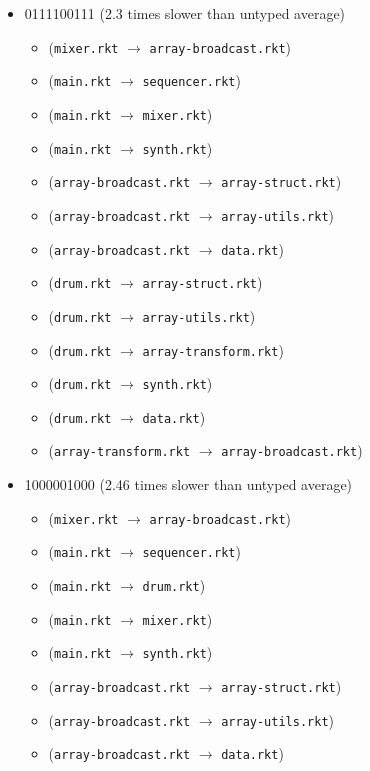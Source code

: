 \documentclass{article}
\newcommand{\mono}[1]{\texttt{#1}}
\begin{document}
\begin{itemize}
\begin{itemize}
  \end{itemize}
\item 0111100111 (2.3 times slower than untyped average)
  \begin{itemize}
  \item (\mono{mixer.rkt} $\rightarrow$ \mono{array-broadcast.rkt})
  \item (\mono{main.rkt} $\rightarrow$ \mono{sequencer.rkt})
  \item (\mono{main.rkt} $\rightarrow$ \mono{mixer.rkt})
  \item (\mono{main.rkt} $\rightarrow$ \mono{synth.rkt})
  \item (\mono{array-broadcast.rkt} $\rightarrow$ \mono{array-struct.rkt})
  \item (\mono{array-broadcast.rkt} $\rightarrow$ \mono{array-utils.rkt})
  \item (\mono{array-broadcast.rkt} $\rightarrow$ \mono{data.rkt})
  \item (\mono{drum.rkt} $\rightarrow$ \mono{array-struct.rkt})
  \item (\mono{drum.rkt} $\rightarrow$ \mono{array-utils.rkt})
  \item (\mono{drum.rkt} $\rightarrow$ \mono{array-transform.rkt})
  \item (\mono{drum.rkt} $\rightarrow$ \mono{synth.rkt})
  \item (\mono{drum.rkt} $\rightarrow$ \mono{data.rkt})
  \item (\mono{array-transform.rkt} $\rightarrow$ \mono{array-broadcast.rkt})
  \end{itemize}
\item 1000001000 (2.46 times slower than untyped average)
  \begin{itemize}
  \item (\mono{mixer.rkt} $\rightarrow$ \mono{array-broadcast.rkt})
  \item (\mono{main.rkt} $\rightarrow$ \mono{sequencer.rkt})
  \item (\mono{main.rkt} $\rightarrow$ \mono{drum.rkt})
  \item (\mono{main.rkt} $\rightarrow$ \mono{mixer.rkt})
  \item (\mono{main.rkt} $\rightarrow$ \mono{synth.rkt})
  \item (\mono{array-broadcast.rkt} $\rightarrow$ \mono{array-struct.rkt})
  \item (\mono{array-broadcast.rkt} $\rightarrow$ \mono{array-utils.rkt})
  \item (\mono{array-broadcast.rkt} $\rightarrow$ \mono{data.rkt})

\end{itemize}
\end{itemize}
\end{document}

